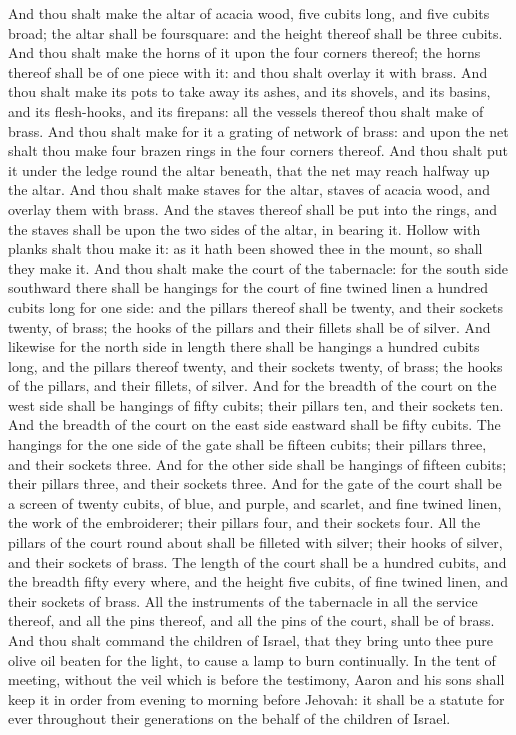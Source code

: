 And thou shalt make the altar of acacia wood, five cubits long, and five cubits broad; the altar shall be foursquare: and the height thereof shall be three cubits. And thou shalt make the horns of it upon the four corners thereof; the horns thereof shall be of one piece with it: and thou shalt overlay it with brass. And thou shalt make its pots to take away its ashes, and its shovels, and its basins, and its flesh-hooks, and its firepans: all the vessels thereof thou shalt make of brass. And thou shalt make for it a grating of network of brass: and upon the net shalt thou make four brazen rings in the four corners thereof. And thou shalt put it under the ledge round the altar beneath, that the net may reach halfway up the altar. And thou shalt make staves for the altar, staves of acacia wood, and overlay them with brass. And the staves thereof shall be put into the rings, and the staves shall be upon the two sides of the altar, in bearing it. Hollow with planks shalt thou make it: as it hath been showed thee in the mount, so shall they make it.  And thou shalt make the court of the tabernacle: for the south side southward there shall be hangings for the court of fine twined linen a hundred cubits long for one side: and the pillars thereof shall be twenty, and their sockets twenty, of brass; the hooks of the pillars and their fillets shall be of silver. And likewise for the north side in length there shall be hangings a hundred cubits long, and the pillars thereof twenty, and their sockets twenty, of brass; the hooks of the pillars, and their fillets, of silver. And for the breadth of the court on the west side shall be hangings of fifty cubits; their pillars ten, and their sockets ten. And the breadth of the court on the east side eastward shall be fifty cubits. The hangings for the one side of the gate shall be fifteen cubits; their pillars three, and their sockets three. And for the other side shall be hangings of fifteen cubits; their pillars three, and their sockets three. And for the gate of the court shall be a screen of twenty cubits, of blue, and purple, and scarlet, and fine twined linen, the work of the embroiderer; their pillars four, and their sockets four. All the pillars of the court round about shall be filleted with silver; their hooks of silver, and their sockets of brass. The length of the court shall be a hundred cubits, and the breadth fifty every where, and the height five cubits, of fine twined linen, and their sockets of brass. All the instruments of the tabernacle in all the service thereof, and all the pins thereof, and all the pins of the court, shall be of brass.  And thou shalt command the children of Israel, that they bring unto thee pure olive oil beaten for the light, to cause a lamp to burn continually. In the tent of meeting, without the veil which is before the testimony, Aaron and his sons shall keep it in order from evening to morning before Jehovah: it shall be a statute for ever throughout their generations on the behalf of the children of Israel. 

